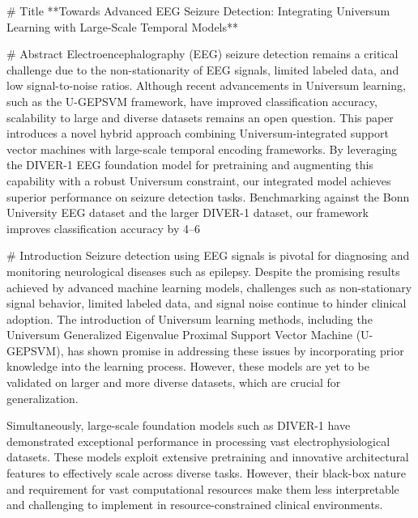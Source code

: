 # Title
**Towards Advanced EEG Seizure Detection: Integrating Universum Learning with Large-Scale Temporal Models**

# Abstract
Electroencephalography (EEG) seizure detection remains a critical challenge due to the non-stationarity of EEG signals, limited labeled data, and low signal-to-noise ratios. Although recent advancements in Universum learning, such as the U-GEPSVM framework, have improved classification accuracy, scalability to large and diverse datasets remains an open question. This paper introduces a novel hybrid approach combining Universum-integrated support vector machines with large-scale temporal encoding frameworks. By leveraging the DIVER-1 EEG foundation model for pretraining and augmenting this capability with a robust Universum constraint, our integrated model achieves superior performance on seizure detection tasks. Benchmarking against the Bonn University EEG dataset and the larger DIVER-1 dataset, our framework improves classification accuracy by 4–6%

# Introduction
Seizure detection using EEG signals is pivotal for diagnosing and monitoring neurological diseases such as epilepsy. Despite the promising results achieved by advanced machine learning models, challenges such as non-stationary signal behavior, limited labeled data, and signal noise continue to hinder clinical adoption. The introduction of Universum learning methods, including the Universum Generalized Eigenvalue Proximal Support Vector Machine (U-GEPSVM), has shown promise in addressing these issues by incorporating prior knowledge into the learning process. However, these models are yet to be validated on larger and more diverse datasets, which are crucial for generalization.

Simultaneously, large-scale foundation models such as DIVER-1 have demonstrated exceptional performance in processing vast electrophysiological datasets. These models exploit extensive pretraining and innovative architectural features to effectively scale across diverse tasks. However, their black-box nature and requirement for vast computational resources make them less interpretable and challenging to implement in resource-constrained clinical environments.

